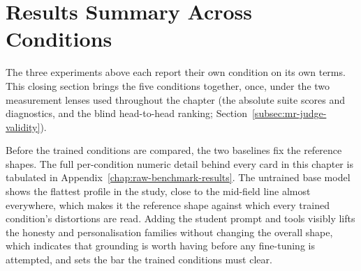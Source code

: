 \section{Results Summary Across Conditions}
\label{sec:mr-results-summary}

The three experiments above each report their own condition on its own terms. This closing section brings the five conditions together, once, under the two measurement lenses used throughout the chapter (the absolute suite scores and diagnostics, and the blind head-to-head ranking; Section~\ref{subsec:mr-judge-validity}).

Before the trained conditions are compared, the two baselines fix the reference shapes. The full per-condition numeric detail behind every card in this chapter is tabulated in Appendix~\ref{chap:raw-benchmark-results}. The untrained base model shows the flattest profile in the study, close to the mid-field line almost everywhere, which makes it the reference shape against which every trained condition's distortions are read. Adding the student prompt and tools visibly lifts the honesty and personalisation families without changing the overall shape, which indicates that grounding is worth having before any fine-tuning is attempted, and sets the bar the trained conditions must clear.

